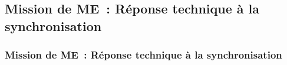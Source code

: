 \subsection{Mission de ME~: Réponse technique à la synchronisation}
\begin{frame}
	\frametitle{Mission de ME~: Réponse technique à la synchronisation}
\end{frame}
